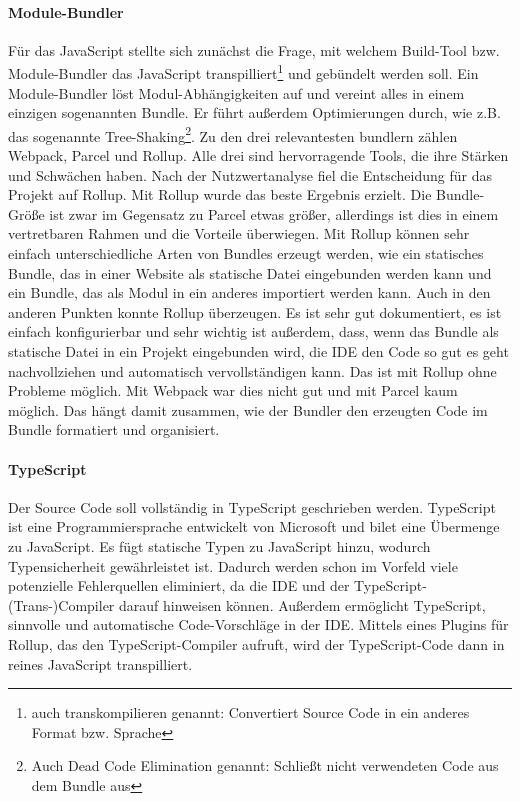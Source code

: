 \paragraph{Module-Bundler} Für das JavaScript stellte sich zunächst die Frage, mit welchem Build-Tool bzw. Module-Bundler das JavaScript transpilliert\footnote{auch transkompilieren genannt: Convertiert Source Code in ein anderes Format bzw. Sprache} und gebündelt werden soll. Ein Module-Bundler löst Modul-Ab\-häng\-ig\-kei\-ten auf und vereint alles in einem einzigen sogenannten Bundle. Er führt außerdem Optimierungen durch, wie z.B. das sogenannte Tree-Shaking\footnote{Auch Dead Code Elimination genannt: Schließt nicht verwendeten Code aus dem Bundle aus}. Zu den drei relevantesten bundlern zählen Webpack, Parcel und Rollup. Alle drei sind hervorragende Tools, die ihre Stärken und Schwächen haben. Nach der Nutzwertanalyse fiel die Entscheidung für das Projekt auf Rollup. Mit Rollup wurde das beste Ergebnis erzielt. Die Bundle-Größe ist zwar im Gegensatz zu Parcel etwas größer, allerdings ist dies in einem vertretbaren Rahmen und die Vorteile überwiegen. Mit Rollup können sehr einfach unterschiedliche Arten von Bundles erzeugt werden, wie ein statisches Bundle, das in einer Website als statische Datei eingebunden werden kann und ein Bundle, das als Modul in ein anderes importiert werden kann. Auch in den anderen Punkten konnte Rollup überzeugen. Es ist sehr gut dokumentiert, es ist einfach konfigurierbar und sehr wichtig ist außerdem, dass, wenn das Bundle als statische Datei in ein Projekt eingebunden wird, die IDE den Code so gut es geht nachvollziehen und automatisch vervollständigen kann. Das ist mit Rollup ohne Probleme möglich. Mit Webpack war dies nicht gut und mit Parcel kaum möglich. Das hängt damit zusammen, wie der Bundler den erzeugten Code im Bundle formatiert und organisiert.


\paragraph{TypeScript} Der Source Code soll vollständig in TypeScript geschrieben werden. TypeScript ist eine Programmiersprache entwickelt von Microsoft und bilet eine Übermenge zu JavaScript. Es fügt statische Typen zu JavaScript hinzu, wodurch Typensicherheit gewährleistet ist. Dadurch werden schon im Vorfeld viele potenzielle Fehlerquellen eliminiert, da die IDE und der TypeScript-(Trans-)Compiler darauf hinweisen können. Außerdem ermöglicht TypeScript, sinnvolle und automatische Code-Vorschläge in der IDE. 
Mittels eines Plugins für Rollup, das den TypeScript-Compiler aufruft, wird der TypeScript-Code dann in reines JavaScript transpilliert. 

